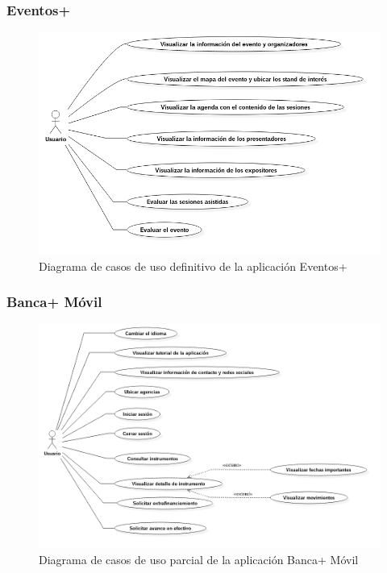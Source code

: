 \documentclass{beamer}
\begin{document}
\begin{frame}[fragile]
\frametitle{Eventos+}
\begin{figure}[H]
  \includegraphics[scale=0.3,type=png,ext=.png,read=.png,angle=0,origin=c]{../diagramas/CU/eventos+/eventosCU}
  \caption*{Diagrama de casos de uso definitivo de la aplicación Eventos+}
\end{figure}

\end{frame}








\begin{frame}[fragile]
\frametitle{Banca+ Móvil}
\begin{figure}[H]
  \includegraphics[scale=0.3,type=png,ext=.png,read=.png,angle=0,origin=c]{../diagramas/CU/banca+/bancaCU}
  \caption*{Diagrama de casos de uso parcial de la aplicación Banca+ Móvil}
\end{figure}

\end{frame}
\end{document}
